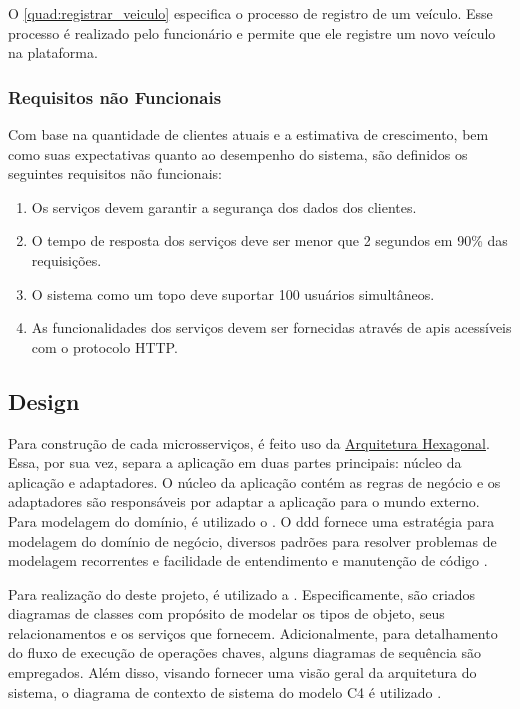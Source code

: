 O \autoref{quad:registrar_veiculo} especifica o processo de registro de um veículo. Esse processo é realizado pelo funcionário e permite que ele registre um novo veículo na plataforma.

\subsubsection{Requisitos não Funcionais}
Com base na quantidade de clientes atuais e a estimativa de crescimento, bem como suas expectativas quanto ao desempenho do sistema, são definidos os seguintes requisitos não funcionais:
\begin{enumerate}
    \item Os serviços devem garantir a segurança dos dados dos clientes.
    \item O tempo de resposta dos serviços deve ser menor que 2 segundos em 90\% das requisições.
    \item O sistema como um topo deve suportar 100 usuários simultâneos.
    \item As funcionalidades dos serviços devem ser fornecidas através de \acrshort{api}s acessíveis com o protocolo HTTP.
\end{enumerate}

\subsection{Design}
Para construção de cada microsserviços, é feito uso da \hyperref[section:hexagonal]{Arquitetura Hexagonal}. Essa, por sua vez, separa a aplicação em duas partes principais: núcleo da aplicação e adaptadores. O núcleo da aplicação contém as regras de negócio e os adaptadores são responsáveis por adaptar a aplicação para o mundo externo. Para modelagem do domínio, é utilizado o . O \acrshort{ddd} fornece uma estratégia para modelagem do domínio de negócio, diversos padrões para resolver problemas de modelagem recorrentes e facilidade de entendimento e manutenção de código \cite{evans2004ddd}.

Para realização do  deste projeto, é utilizado a . Especificamente, são criados diagramas de classes com propósito de modelar os tipos de objeto, seus relacionamentos e os serviços que fornecem. Adicionalmente, para detalhamento do fluxo de execução de operações chaves, alguns diagramas de sequência são empregados. Além disso, visando fornecer uma visão geral da arquitetura do sistema, o diagrama de contexto de sistema do modelo C4 é utilizado \cite{c4Model}. 

